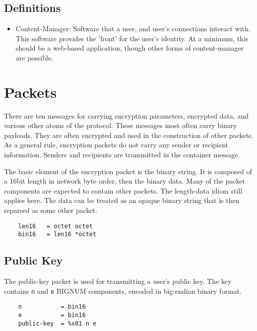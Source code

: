 \documentclass[letterpaper,11pt,oneside]{article}
\begin{document}
\subsection{Definitions}

\begin{itemize}

\item Content-Manager: Software that a user, and user's connections interact with.
This software provides the 'front' for the user's identity. At a minimum, this
should be a web-based application, though other forms of content-manager are
possible.

\end{itemize}

\section{Packets}

There are ten messages for carrying encryption parameters, encrypted data, and
various other atoms of the protocol. These messages most often carry binary
payloads. They are often encrypted and used in the construction of other
packets. As a general rule, encryption packets do not carry any sender or
recipient information. Senders and recipients are transmitted in the container
message.

The basic element of the encryption packet is the binary string. It is composed
of a 16bit length in network byte order, then the binary data. Many of the
packet components are expected to contain other packets. The length-data idiom
still applies here. The data can be treated as an opaque binary string that is
then reparsed as some other packet.

\vspace{10pt}
\begin{verbatim}
    len16   = octet octet
    bin16   = len16 *octet
\end{verbatim}
\vspace{10pt}

\subsection{Public Key}
\label{public-key-packet}

The public-key packet is used for transmitting a user's public key. The key
contains \verb|n| and \verb|e| BIGNUM components, encoded in big-endian binary
format. 

\vspace{10pt}
\begin{verbatim}
    n           = bin16
    e           = bin16
    public-key  = %x01 n e
\end{verbatim}
\vspace{10pt}
\end{document}
